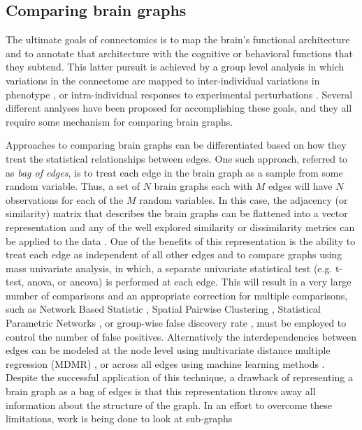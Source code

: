 \subsection{Comparing brain graphs} 

The ultimate goals of connectomics is to map the brain's functional architecture and to annotate that architecture with the cognitive or behavioral functions that they subtend. This latter pursuit is achieved by a group level analysis in which variations in the connectome are mapped to inter-individual variations in phenotype \cite{Kelly2011}, or intra-individual responses to experimental perturbations \cite{Shirer}. Several different analyses have been proposed for accomplishing these goals, and they all require some mechanism for comparing brain graphs. 
 
Approaches to comparing brain graphs can be differentiated based on how they treat the statistical relationships between edges. One such approach, referred to as \emph{bag of edges}, is to treat each edge in the brain graph as a sample from some random variable. Thus, a set of $N$ brain graphs each with $M$ edges will have $N$ observations for each of the $M$ random variables. In this case, the adjacency (or similarity) matrix that describes the brain graphs can be flattened into a vector representation and any of the well explored similarity or dissimilarity metrics can be applied to the data \cite{Ravindran}. One of the benefits of this representation is the ability to treat each edge as independent of all other edges and to compare graphs using mass univariate analysis, in which, a separate univariate statistical test (e.g. t-test, anova, or ancova) is performed at each edge. This will result in a very large number of comparisons and an appropriate correction for multiple comparisons, such as Network Based Statistic \cite{Zalesky2011}, Spatial Pairwise Clustering \cite{Zalesky2012}, Statistical Parametric Networks \cite{Ginestet2013}, or group-wise false discovery rate \cite{}, must be employed to control the number of false positives. Alternatively the interdependencies between edges can be modeled at the node level using multivariate distance multiple regression (MDMR) \cite{Shehzad2014}, or across all edges using machine learning methods \cite{Craddock2009, Dosenbach2010, Richiardi2011}. Despite the successful application of this technique, a drawback of representing a brain graph as a bag of edges is that this representation throws away all information about the structure of the graph.  In an effort to overcome these limitations, work is being done to look at sub-graphs \cite{} 

